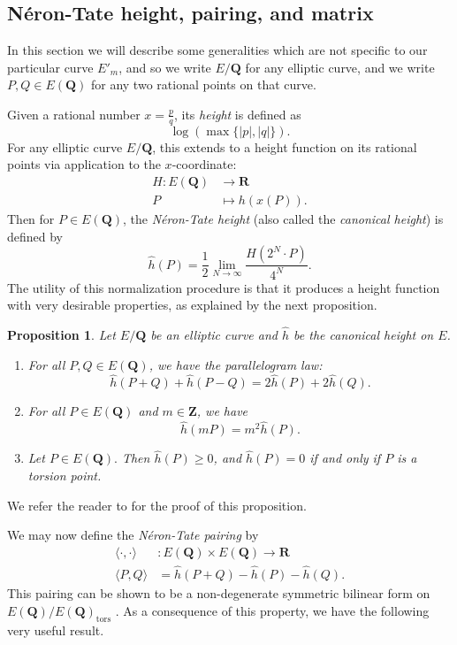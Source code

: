\documentclass{amsart}
\newtheorem{proposition}[theorem]{Proposition}
\numberwithin{equation}{section}
\theoremstyle{remark}
\newcommand{\Z}{\mathbf{Z}}
\newcommand{\Q}{\mathbf{Q}}
\begin{document}
\subsection{N\'{e}ron-Tate height, pairing, and matrix} In this section we will describe some generalities which are not specific to our particular curve $E'_m$, and so we write $E/\Q$ for any elliptic curve, and we write $P,Q \in E(\Q)$ for any two rational points on that curve.

Given a rational number $x=\frac{p}{q}$, its \textit{height} is defined as
\[
\log(\max\{|p|,|q| \}).
\]
For any elliptic curve $E/\Q$, this extends to a height function on its rational points via application to the $x$-coordinate:
\begin{align*}
    H \colon E(\Q) &\rightarrow \mathbf{R}\\ P &\mapsto h(x(P)).
\end{align*}
Then for $P \in E(\Q)$, the \textit{N\'{e}ron-Tate  height} (also called the \textit{canonical height}) is defined by
\[
\hat{h}(P)=\frac{1}{2} \lim_{N \to \infty} \frac{H(2^N \cdot P)}{4^N}.
\]
The utility of this normalization procedure is that it produces a height function with very desirable properties, as explained by the next proposition.

\begin{proposition}\label{prop:Neron-tate-height}
Let $E/\Q$ be an elliptic curve and $\hat{h}$ be the canonical height on $E$.
\begin{enumerate}
    \item For all $P,Q \in E(\Q)$, we have the parallelogram law:
    \[
    \hat{h}(P+Q)+\hat{h}(P-Q) = 2 \hat{h}(P) + 2 \hat{h}(Q).
    \]
    \item For all $P \in E(\Q)$ and $m \in \Z$, we have
    \[
    \hat{h}(mP)=m^2 \hat{h}(P).
    \]
    \item Let $P \in E(\Q).$ Then $\hat{h}(P)\geq0$, and $\hat{h}(P)=0$
 if and only if $P$ is a torsion point.
\end{enumerate}
\end{proposition}
We refer the reader to \cite[Chapter VIII, Theorem 9.3]{silverman-arithmetic} for the proof of this proposition.

We may now define the \textit{N\'{e}ron-Tate pairing} by
\begin{align*}
\langle \cdot , \cdot \rangle &\colon E(\Q) \times E(\Q) \to \mathbf{R}\\
\langle P, Q \rangle &= \hat{h}(P+Q)-\hat{h}(P)-\hat{h}(Q).
\end{align*}
This pairing can be shown to be a non-degenerate symmetric bilinear form on $E(\Q)/E(\Q)_{\mathrm{tors}}$ \cite[Theorem 2.8.5]{alvaro-book}. As a consequence of this property, we have the following very useful result.
\end{document}
